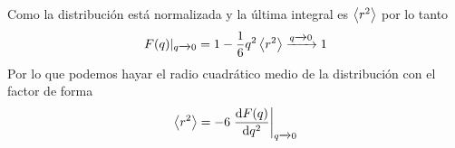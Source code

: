 Como la distribución está normalizada y la última integral es $\expval{r^2}$ por lo tanto 
\begin{equation}
    F(q)|_{q\xrightarrow{}0}=1-\frac{1}{6} q^2 \expval{r^2} \xrightarrow{q\xrightarrow{}0}1
\end{equation}
Por lo que podemos hayar el radio cuadrático medio de la distribución con el factor de forma
\begin{equation}
    \expval{r^2}=-6\left.\dv{F(q)}{q^2}\right |_{q\xrightarrow{}0}
\end{equation}